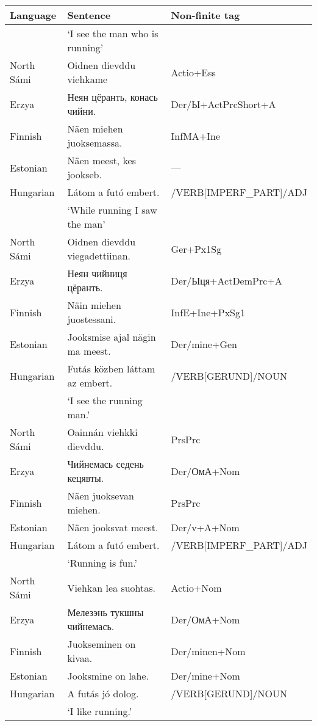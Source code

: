 \documentclass[free]{flammie}
\begin{document}
\begin{table}
\centering
\begin{scriptsize}

\begin{tabular}{lll}
\textbf{Language} & \textbf{Sentence} & \textbf{Non-finite tag} \\
\hline
           &  `I see the man who is running' & \\
North Sámi & Oidnen dievddu viehkame & Actio+Ess \\
Erzya & Неян цёранть, конась чийни. & Der/Ы+ActPrcShort+A \\
Finnish & Näen miehen juoksemassa. & InfMA+Ine\\
Estonian & Näen meest, kes jookseb. & --- \\
Hungarian & Látom a futó embert. & /VERB[IMPERF\_PART]/ADJ \\
\hline
           &  `While running I saw the man' & \\
North Sámi & Oidnen dievddu viegadettiinan. & Ger+Px1Sg\\
Erzya & Неян чийниця цёранть. & Der/Ыця+ActDemPrc+A \\
Finnish & Näin miehen juostessani. & InfE+Ine+PxSg1 \\
Estonian & Jooksmise ajal nägin ma meest. &  Der/mine+Gen \\
Hungarian & Futás közben láttam az embert.& /VERB[GERUND]/NOUN \\
\hline
           &  `I see the running man.' & \\
North Sámi &  Oainnán viehkki dievddu. & PrsPrc \\
Erzya & Чийнемась седень кецявты. & Der/ОмА+Nom\\
Finnish & Näen juoksevan miehen.  & PrsPrc  \\
Estonian & Näen jooksvat meest. & Der/v+A+Nom\\
Hungarian & Látom a futó embert. & /VERB[IMPERF\_PART]/ADJ \\
\hline
           &  `Running is fun.' & \\
North Sámi & Viehkan lea suohtas.  & Actio+Nom \\
Erzya & Мелезэнь тукшны чийнемась. & Der/ОмА+Nom\\
Finnish & Juokseminen on kivaa.  &  Der/minen+Nom \\
Estonian & Jooksmine on lahe. & Der/mine+Nom \\
Hungarian & A futás jó dolog.& /VERB[GERUND]/NOUN \\
\hline
           &  `I like running.' & \\

\end{tabular}
\end{scriptsize}
\end{table}
\end{document}
